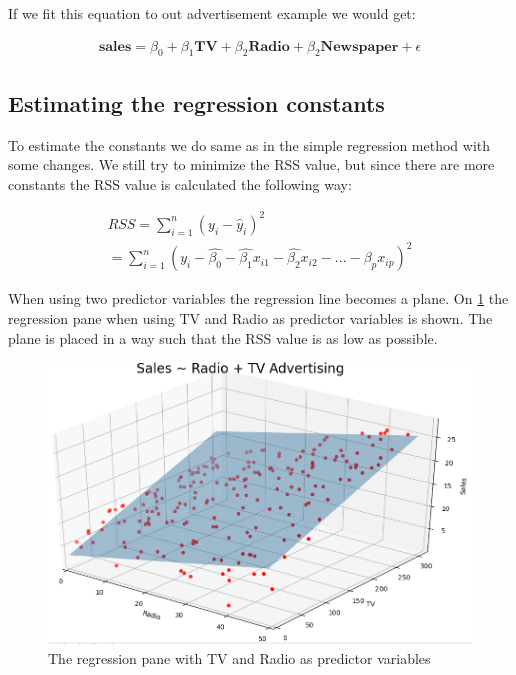 If we fit this equation to out advertisement example we would get:

\begin{equation} \label{eq:RSS_multi}
\begin{split}
\textbf{sales} = \beta_0 + \beta_1 \textbf{TV} + \beta_2 \textbf{Radio}+\beta_2 \textbf{Newspaper}+\epsilon
\end{split}
\end{equation}

\subsection{Estimating the regression constants}
To estimate the constants we do same as in the simple regression method with some changes. We still try to minimize the RSS value, but since there are more constants the RSS value is calculated the following way:

\begin{equation} \label{eq:RSS_multi_extended}
\begin{split}
 RSS = \sum_{i=1}^{n}(y_{i}-\hat{y}_{i})^{2} \\
	= \sum_{i=1}^{n}(y_{i}-\hat{\beta_0}-\hat{\beta_1}x_{i1}-\hat{\beta_2}x_{i2}-...-\beta_p x_{ip})^{2}
\end{split}
\end{equation}

When using two predictor variables the regression line becomes a plane. On \cref{fig:Multi_reg_plane} the regression pane when using TV and Radio as predictor variables is shown. The plane is placed in a way such that the RSS value is as low as possible. 

\begin{figure}[H]
	\centering
	\includegraphics[width=\textwidth]{Img/Multi_reg_plane.PNG}
	\caption{The regression pane with TV and Radio as predictor variables}
	\label{fig:Multi_reg_plane}
\end{figure} 

